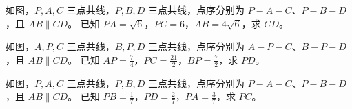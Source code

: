 \documentclass{exam-zh}
\begin{document}

\begin{problem}[points=10]
  \noindent
  \begin{minipage}[t]{\dimexpr\linewidth-60mm-6mm\relax}
    \vspace{0pt}
    如图，$P,A,C$ 三点共线，$P,B,D$ 三点共线，点序分别为 $P-A-C$、$P-B-D$，且 $AB\parallel CD$。
已知 $PA=\sqrt{6}$，$PC=6$，$AB=4\sqrt{6}$，求 $CD$。
    
  \end{minipage}\hfill
  \begin{diagramcoltikz}{60mm}{先看平行边方向，再判断 A 字型或 8 字型及对应边。}
  }
  \end{diagramcoltikz}
  \par\medskip
  \answerarea[42mm]
\end{problem}



\begin{problem}[points=10]
  \noindent
  \begin{minipage}[t]{\dimexpr\linewidth-60mm-6mm\relax}
    \vspace{0pt}
    如图，$A,P,C$ 三点共线，$B,P,D$ 三点共线，点序分别为 $A-P-C$、$B-P-D$，且 $AB\parallel CD$。
已知 $AP=\frac{7}{4}$，$PC=\frac{21}{2}$，$BP=\frac{7}{2}$，求 $PD$。
    
  \end{minipage}\hfill
  \begin{diagramcoltikz}{60mm}{先看平行边方向，再判断 A 字型或 8 字型及对应边。}
  }
  \end{diagramcoltikz}
  \par\medskip
  \answerarea[42mm]
\end{problem}



\begin{problem}[points=10]
  \noindent
  \begin{minipage}[t]{\dimexpr\linewidth-60mm-6mm\relax}
    \vspace{0pt}
    如图，$P,A,C$ 三点共线，$P,B,D$ 三点共线，点序分别为 $P-A-C$、$P-B-D$，且 $AB\parallel CD$。
已知 $PB=\frac{1}{7}$，$PD=\frac{2}{7}$，$PA=\frac{3}{7}$，求 $PC$。
    
  \end{minipage}\hfill
  \begin{diagramcoltikz}{60mm}{先看平行边方向，再判断 A 字型或 8 字型及对应边。}
  }
  \end{diagramcoltikz}
  \par\medskip
  \answerarea[42mm]
\end{problem}
\end{document}
